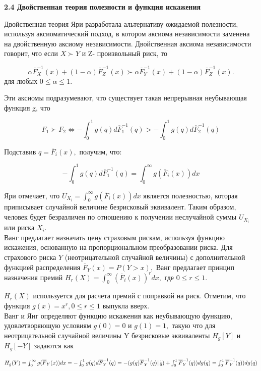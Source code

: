 \documentclass[12pt,a4paper]{article}
\begin{document}
{\bf  2.4 Двойственная теория полезности и функция искажения }

Двойственная теория Яри разработала альтернативу ожидаемой полезности, используя аксиоматический подход, в котором аксиома независимости заменена на двойственную аксиому независимости.  Двойственная аксиома независимости говорит, что если $ X \succ Y$ и Z- произвольный риск, то

$$\alpha {\overline  F}^{-1}_X(x) + (1-\alpha ){ \overline F}^{-1} _Z(x) \succ \alpha {\overline  F}^{-1}_Y(x) + (1-\alpha ){ \overline F}^{-1} _Z(x).$$
для любых $0 \leq \alpha \leq 1.$

Эти аксиомы подразумевают, что существует такая непрерывная неубывающая функция g, что 

$$F_1 \succ F_2 \Leftrightarrow 
 - \int^{1}_{0} g(q)d{\overline  F}^{-1}_1(q)   >   - \int^{1}_{0} g(q)d{\overline  F}^{-1}_2(q)  $$ 


Подставив $q={\overline  F}_i(x),$ получим,  что:

$$  - \int^{1}_{0} g(q)d{\overline  F}^{-1}_1(q)  = \int^{\infty}_{0} g({\overline  F}_i(x))dx$$

Яри отмечает, что $U_{X_i} =   \int^{\infty}_{0} g({\overline  F}_i(x))dx$ является полезностью, которая приписывает случайной величине безрисковый эквивалент. Таким образом, человек будет безразличен по отношению к получении неслучайной суммы $U_{X_i}$ или риска $X_i.$\\

Ванг предлагает назначать цену страховым рискам, используя функцию искажения, основанную на пропорциональном преобразовании риска. Для страхового риска $Y$ (неотрицательной случайной величины) с дополнительной функцией распределения $ {\overline  F}_Y(x) = P(Y > x),$ Ванг предлагает принцип назначения премий $H_{r}(X) = \int^{\infty}_{0} ({\overline  F}_i(x))^{r}dx, $ где $0 \leq r \leq 1.$

 $H_{r}(X)$ используется для расчета премий с поправкой на риск. Отметим, что функция $g(x)= x^{r}, 0 \leq r \leq 1$ выпукла вверх.\\
 
 Ванг и Янг определяют функцию искажения как неубывающую функцию, удовлетворяющую условиям  $g(0)=0$ и $g(1)=1,$  такую что для неотрицательной случайной величины Y безрисковые эквиваленты  
 $ H_{g} \left[ Y \right] $ и $ H_{g} \left[ -Y \right] $   задаются как 
 
 $ H_{g}(Y) = \int^{\infty}_{0} g({\overline  F}_Y(x))dx 
 =  - \int_{0}^{1} g(q)d{\overline  F}^{-1}_Y(q) \\
 = - (g(q){\overline  F}^{-1}_Y(q) \|_{0}^{1}) + \int_{0}^{1} {\overline  F}^{-1}_Y(q))dg(q)
 =  \int_{0}^{1} {\overline  F}^{-1}_Y(q))dg(q)$\\
 
\end{document}
